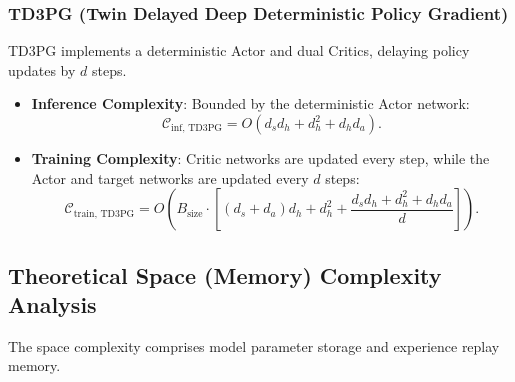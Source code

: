 \subsubsection{TD3PG (Twin Delayed Deep Deterministic Policy Gradient)}
TD3PG implements a deterministic Actor and dual Critics, delaying policy updates by $d$ steps.
\begin{itemize}
    \item \textbf{Inference Complexity}: Bounded by the deterministic Actor network:
    \begin{equation}
        \mathcal{C}_{\text{inf, TD3PG}} = O(d_s d_h + d_h^2 + d_h d_a).
    \end{equation}
    \item \textbf{Training Complexity}: Critic networks are updated every step, while the Actor and target networks are updated every $d$ steps:
    \begin{equation}
        \mathcal{C}_{\text{train, TD3PG}} = O\left( B_{\text{size}} \cdot \left[ (d_s + d_a) d_h + d_h^2 + \frac{d_s d_h + d_h^2 + d_h d_a}{d} \right] \right).
    \end{equation}
\end{itemize}

\subsection{Theoretical Space (Memory) Complexity Analysis}
The space complexity comprises model parameter storage and experience replay memory.

